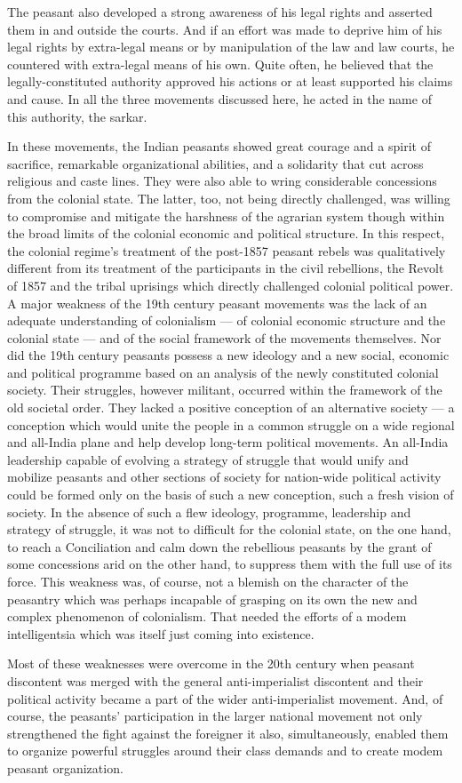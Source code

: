 The peasant also developed a strong awareness of his legal rights and asserted them in and outside the courts. And if an effort was made to deprive him of his legal rights by extra-legal means or by manipulation of the law and law courts, he countered with extra-legal means of his own. Quite often, he believed that the legally-constituted authority approved his actions or at least supported his claims and cause. In all the three movements discussed here, he acted in the name of this authority, the sarkar.

In these movements, the Indian peasants showed great courage and a spirit of sacrifice, remarkable organizational abilities, and a solidarity that cut across religious and caste lines. They were also able to wring considerable concessions from the colonial state. The latter, too, not being directly challenged, was willing to compromise and mitigate the harshness of the agrarian system though within the broad limits of the colonial economic and political structure. In this respect, the colonial regime's treatment of the post-1857 peasant rebels was qualitatively different from its treatment of the participants in the civil rebellions, the Revolt of 1857 and the tribal uprisings which directly challenged colonial political power. A major weakness of the 19th century peasant movements was the lack of an adequate understanding of colonialism — of colonial economic structure and the colonial state — and of the social framework of the movements themselves. Nor did the 19th century peasants possess a new ideology and a new social, economic and political programme based on an analysis of the newly constituted colonial society. Their struggles, however militant, occurred within the framework of the old societal order. They lacked a positive conception of an alternative society — a conception which would unite the people in a common struggle on a wide regional and all-India plane and help develop long-term political movements. An all-India leadership capable of evolving a strategy of struggle that would unify and mobilize peasants and other sections of society for nation-wide political activity could be formed only on the basis of such a new conception, such a fresh vision of society. In the absence of such a flew ideology, programme, leadership and strategy of struggle, it was not to difficult for the colonial state, on the one hand, to reach a Conciliation and calm down the rebellious peasants by the grant of some concessions arid on the other hand, to suppress them with the full use of its force. This weakness was, of course, not a blemish on the character of the peasantry which was perhaps incapable of grasping on its own the new and complex phenomenon of colonialism. That needed the efforts of a modem intelligentsia which was itself just coming into existence.

Most of these weaknesses were overcome in the 20th century when peasant discontent was merged with the general anti-imperialist discontent and their political activity became a part of the wider anti-imperialist movement. And, of course, the peasants' participation in the larger national movement not only strengthened the fight against the foreigner it also, simultaneously, enabled them to organize powerful struggles around their class demands and to create modem peasant organization.

